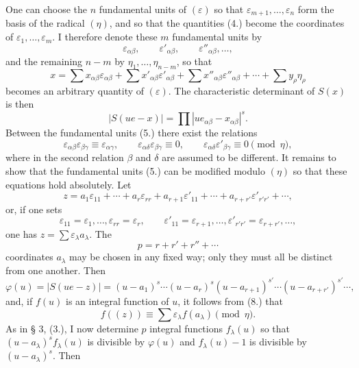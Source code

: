 \documentclass[11pt]{article}
\newcommand{\eps}{\varepsilon}
\begin{document}
One can choose the $n$ fundamental units of $(\eps)$ so that $\eps_{m+1},\ldots,\eps_n$ form the basis of the radical $(\eta)$, and so that the quantities (4.) become the coordinates of $\eps_1,\ldots,\eps_m$. I therefore denote these $m$ fundamental units by
\begin{equation}\tag{5.}
 \eps_{\alpha\beta},\qquad \eps'_{\alpha\beta},\qquad \eps''_{\alpha\beta},\ldots,
\end{equation}
and the remaining $n-m$ by $\eta_1,\ldots,\eta_{n-m}$, so that
\begin{equation}\tag{6.}
 x=\sum x_{\alpha\beta}\eps_{\alpha\beta}
 +\sum x'_{\alpha\beta}\eps'_{\alpha\beta}
 +\sum x''_{\alpha\beta}\eps''_{\alpha\beta}
 +\cdots+\sum y_\rho\eta_\rho
\end{equation}
becomes an arbitrary quantity of $(\eps)$. The characteristic determinant of $S(x)$ is then
\begin{equation}\tag{7.}
 |S(ue-x)|=\prod |u e_{\alpha\beta}-x_{\alpha\beta}|^{s}.
\end{equation}
Between the fundamental units (5.) there exist the relations
\begin{equation}\tag{8.}
 \eps_{\alpha\beta}\eps_{\beta\gamma}\equiv\eps_{\alpha\gamma},
 \qquad
 \eps_{\alpha\delta}\eps_{\beta\gamma}\equiv0,
 \qquad
 \eps_{\alpha\delta}\eps'_{\beta\gamma}\equiv0
 \pmod{\eta},
\end{equation}
where in the second relation $\beta$ and $\delta$ are assumed to be different. It remains to show that the fundamental units (5.) can be modified modulo $(\eta)$ so that these equations hold absolutely. Let
\[
 z=a_1\eps_{11}+\cdots+a_r\eps_{rr}+a_{r+1}\eps'_{11}+\cdots+a_{r+r'}\eps'_{r'r'}+\cdots,
\]
or, if one sets
\begin{equation}\tag{9.}
 \eps_{11}=\eps_1,
 \ldots,
 \eps_{rr}=\eps_r,
 \qquad
 \eps'_{11}=\eps_{r+1},
 \ldots,
 \eps'_{r'r'}=\eps_{r+r'},\ldots,
\end{equation}
one has $z=\sum \eps_\lambda a_\lambda$. The
\begin{equation}\tag{10.}
 p=r+r'+r''+\cdots
\end{equation}
coordinates $a_\lambda$ may be chosen in any fixed way; only they must all be distinct from one another. Then
\[
 \varphi(u)=|S(ue-z)|=(u-a_1)^s\cdots(u-a_r)^s(u-a_{r+1})^{s'}\cdots(u-a_{r+r'})^{s'}\cdots,
\]
and, if $f(u)$ is an integral function of $u$, it follows from (8.) that
\[
 f((z))\equiv \sum \eps_\lambda f(a_\lambda)\pmod{\eta}.
\]
As in § 3, (3.), I now determine $p$ integral functions $f_\lambda(u)$ so that $(u-a_\lambda)^s f_\lambda(u)$ is divisible by $\varphi(u)$ and $f_\lambda(u)-1$ is divisible by $(u-a_\lambda)^s$. Then
\end{document}
